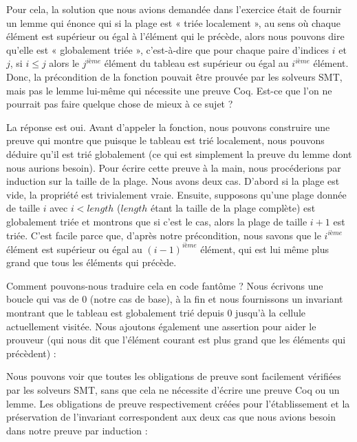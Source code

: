 

Pour cela, la solution que nous avions demandée dans l'exercice était de fournir
un lemme qui énonce qui si la plage est « triée localement », au sens où chaque
élément est supérieur ou égal à l'élément qui le précède, alors nous pouvons
dire qu'elle est « globalement triée », c'est-à-dire que pour chaque paire
d'indices $i$ et $j$, si $i \leq j$ alors le $j^{ième}$ élément du tableau est
supérieur ou égal au $i^{ième}$ élément. Donc, la précondition de la fonction
pouvait être prouvée par les solveurs SMT, mais pas le lemme lui-même qui
nécessite une preuve Coq. Est-ce que l'on ne pourrait pas faire quelque chose
de mieux à ce sujet ?


La réponse est oui. Avant d'appeler la fonction, nous pouvons construire une
preuve qui montre que puisque le tableau est trié localement, nous pouvons
déduire qu'il est trié globalement (ce qui est simplement la preuve du lemme
dont nous aurions besoin). Pour écrire cette preuve à la main, nous procéderions
par induction sur la taille de la plage. Nous avons deux cas. D'abord si la
plage est vide, la propriété est trivialement vraie. Ensuite, supposons qu'une
plage donnée de taille $i$ avec $i < length$ ($length$ étant la taille de la
plage complète) est globalement triée et montrons que si c'est le cas, alors la
plage de taille $i+1$ est triée. C'est facile parce que, d'après notre
précondition, nous savons que le $i^{ième}$ élément est supérieur ou égal au
$(i-1)^{ième}$ élément, qui est lui même plus grand que tous les éléments qui
précède.


Comment pouvons-nous traduire cela en code fantôme ? Nous écrivons une boucle qui
vas de $0$ (notre cas de base), à la fin  et nous fournissons
un invariant montrant que le tableau est globalement trié depuis $0$ jusqu'à la
cellule actuellement visitée. Nous ajoutons également une assertion pour aider le
prouveur (qui nous dit que l'élément courant est plus grand que les éléments qui
précèdent) :






Nous pouvons voir que toutes les obligations de preuve sont facilement
vérifiées par les solveurs SMT, sans que cela ne nécessite d'écrire une preuve Coq
ou un lemme. Les obligations de preuve respectivement créées pour
l'établissement et la préservation de l'invariant correspondent aux deux cas que
nous avions besoin dans notre preuve par induction :


